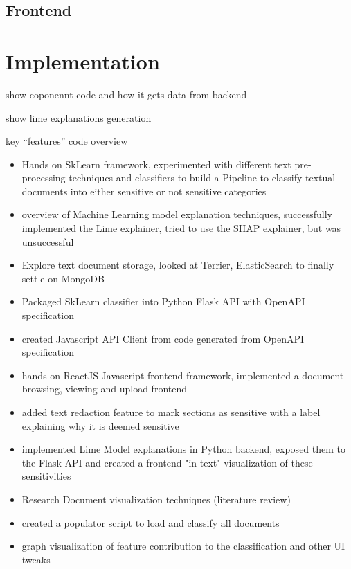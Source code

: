 \documentclass{l4proj}
\begin{document}
\section{Frontend}

\chapter{Implementation}

show coponennt code and how it gets data from backend

show lime explanations generation

key ``features'' code overview


\begin{itemize}
    \item Hands on SkLearn framework, experimented with different text pre-processing techniques and classifiers to build a Pipeline to classify textual documents into either sensitive or not sensitive categories
    \item overview of Machine Learning model explanation techniques, successfully implemented the Lime explainer, tried to use the SHAP explainer, but was unsuccessful
    \item Explore text document storage, looked at Terrier, ElasticSearch to finally settle on MongoDB
    \item Packaged SkLearn classifier into Python Flask API with OpenAPI specification
    \item created Javascript API Client from code generated from OpenAPI specification
    \item hands on ReactJS Javascript frontend framework, implemented a document browsing, viewing and upload frontend
    \item added text redaction feature to mark sections as sensitive with a label explaining why it is deemed sensitive
    \item implemented Lime Model explanations in Python backend, exposed them to the Flask API and created a frontend "in text" visualization of these sensitivities
    \item Research Document visualization techniques (literature review)
    \item created a populator script to load and classify all documents
    \item graph visualization of feature contribution to the classification and other UI tweaks
\end{itemize}
\end{document}
